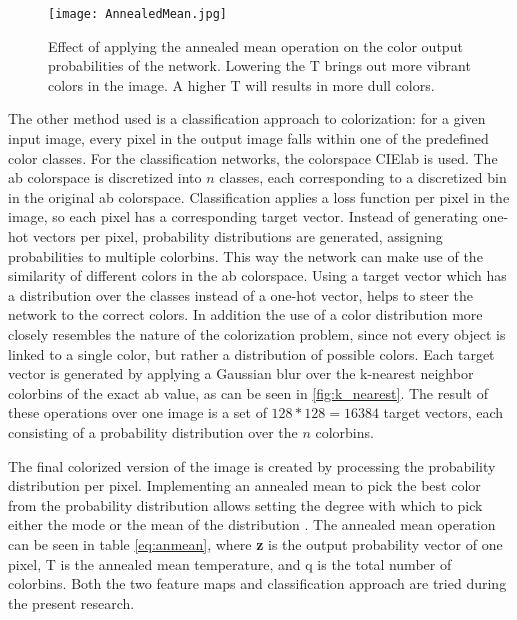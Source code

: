 \begin{figure}[h!]
	\centering
	\texttt{[image: AnnealedMean.jpg]}
	\centering
	\caption{Effect of applying the annealed mean operation on the  color output probabilities of the network. Lowering the T brings out more vibrant colors in the image. A higher T will results in more dull colors.}
	\label{fig:anmean}
\end{figure}

The other method used is a classification approach to colorization: for a given input image, every pixel in the output image falls within one of the predefined color classes. For the classification networks, the colorspace CIElab is used. The ab colorspace is discretized into $n$ classes, each corresponding to a discretized bin in the original ab colorspace. Classification applies a loss function per pixel in the image, so each pixel has a corresponding target vector. Instead of generating one-hot vectors per pixel, probability distributions are generated, assigning probabilities to multiple colorbins. This way the network can make use of the similarity of different colors in the ab colorspace. Using a target vector which has a distribution over the classes instead of a one-hot vector, helps to steer the network to the correct colors. In addition the use of a color distribution more closely resembles the nature of the colorization problem, since not every object is linked to a single color, but rather a distribution of possible colors. 
Each target vector is generated by applying a Gaussian blur over the k-nearest neighbor colorbins of the exact ab value, as can be seen in \ref{fig:k_nearest}. The result of these operations over one image is a set of $128*128=16384$ target vectors, each consisting of a probability distribution over the $n$ colorbins. 

The final colorized version of the image is created by processing the probability distribution per pixel. Implementing an annealed mean to pick the best color from the probability distribution allows setting the degree with which to pick either the mode or the mean of the distribution \cite{Zhang}. The annealed mean operation can be seen in table \ref{eq:anmean}, where \textbf{z} is the output probability vector of one pixel, T is the annealed mean temperature, and q is the total number of colorbins. Both the two feature maps and classification approach are tried during the present research.\\


\newpage

